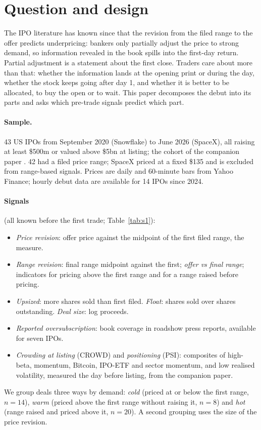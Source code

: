 \documentclass[11pt]{article}
\begin{document}
\section{Question and design}
The IPO literature has known since \citet{hanley1993} that the revision from the filed range to the offer predicts underpricing: bankers only partially adjust the price to strong demand, so information revealed in the book spills into the first-day return. Partial adjustment is a statement about the first close. Traders care about more than that: whether the information lands at the opening print or during the day, whether the stock keeps going after day 1, and whether it is better to be allocated, to buy the open or to wait. This paper decomposes the debut into its parts and asks which pre-trade signals predict which part.

\paragraph{Sample.} 43 US IPOs from September 2020 (Snowflake) to June 2026 (SpaceX), all raising at least \$500m or valued above \$5bn at listing; the cohort of the companion paper \citep{frenzyfade2026}. 42 had a filed price range; SpaceX priced at a fixed \$135 and is excluded from range-based signals. Prices are daily and 60-minute bars from Yahoo Finance; hourly debut data are available for 14 IPOs since 2024.

\paragraph{Signals} (all known before the first trade; Table~\ref{tab:s1}):
\begin{itemize}[leftmargin=1.2em]
\item \textit{Price revision}: offer price against the midpoint of the first filed range, the \citet{hanley1993} measure.
\item \textit{Range revision}: final range midpoint against the first; \textit{offer vs final range}; indicators for pricing above the first range and for a range raised before pricing.
\item \textit{Upsized}: more shares sold than first filed. \textit{Float}: shares sold over shares outstanding. \textit{Deal size}: log proceeds.
\item \textit{Reported oversubscription}: book coverage in roadshow press reports, available for seven IPOs.
\item \textit{Crowding at listing} (CROWD) and \textit{positioning} (PSI): composites of high-beta, momentum, Bitcoin, IPO-ETF and sector momentum, and low realised volatility, measured the day before listing, from the companion paper.
\end{itemize}
We group deals three ways by demand: \textit{cold} (priced at or below the first range, $n=14$), \textit{warm} (priced above the first range without raising it, $n=8$) and \textit{hot} (range raised and priced above it, $n=20$). A second grouping uses the size of the price revision.
\end{document}
